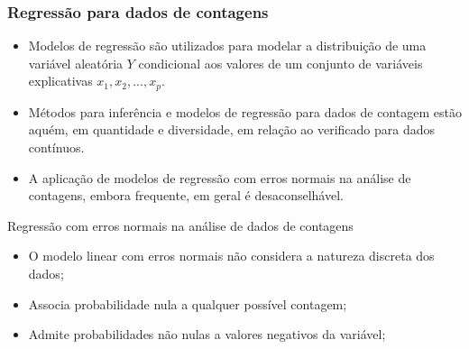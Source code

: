 \begin{frame}\frametitle{Regressão para dados de contagens}

\begin{itemize}

\item Modelos de regressão são utilizados para modelar a distribuição 
de uma variável aleatória $Y$ condicional aos valores de um conjunto 
de variáveis explicativas $x_{1},x_{2},...,x_{p}$.

\vspace{0,5cm}

\item Métodos para inferência e modelos de regressão para dados de 
contagem estão aquém, em quantidade e diversidade, em relação ao 
verificado para dados contínuos.

\vspace{0,5cm}

\item A aplicação de modelos de regressão com erros normais na análise 
de contagens, embora frequente, em geral é desaconselhável.

\end{itemize}
\end{frame}

\begin{frame}{Regressão com erros normais na análise de dados de contagens}
    \vspace{0,5cm}

    \begin{itemize}
        \item O modelo linear com erros normais não considera a 
        natureza discreta dos dados;
        \vspace{0,5cm}
        \item Associa probabilidade nula a qualquer possível contagem;
        \vspace{0,5cm}
        \item Admite probabilidades não nulas a valores negativos 
        da variável;
    \end{itemize}

\end{frame}

